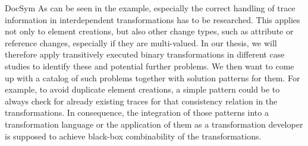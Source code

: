 \begin{copiedFrom}{DocSym}
As can be seen in the example, especially the correct handling of trace information in interdependent transformations has to be researched.
This applies not only to element creations, but also other change types, such as attribute or reference changes, especially if they are multi-valued.
In our thesis, we will therefore apply transitively executed binary transformations in different case studies to identify these and potential further problems.
We then want to come up with a catalog of such problems %
together with solution patterns for them.
For example, to avoid duplicate element creations, a simple pattern could be to always check for already existing traces for that consistency relation in the transformations.
In consequence, the integration of those patterns into a transformation language or the application of them as a transformation developer is supposed to achieve black-box combinability of the transformations.

\end{copiedFrom} %



